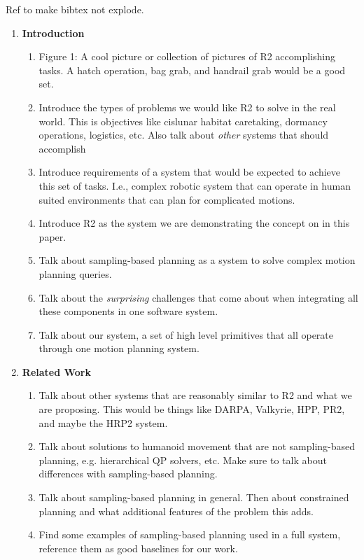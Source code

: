 Ref to make bibtex not explode.\cite{Baker2017}

\begin{enumerate}
\item \textbf{Introduction}
  \begin{enumerate}
  \item
    Figure 1: A cool picture or collection of pictures of R2 accomplishing tasks.
    A hatch operation, bag grab, and handrail grab would be a good set.
  \item
    Introduce the types of problems we would like R2 to solve in the real world.
    This is objectives like cislunar habitat caretaking, dormancy operations, logistics, etc.
    Also talk about \emph{other} systems that should accomplish 
  \item
    Introduce requirements of a system that would be expected to achieve this set of tasks.
    I.e., complex robotic system that can operate in human suited environments that can plan for complicated motions.
  \item
    Introduce R2 as the system we are demonstrating the concept on in this paper.
  \item
    Talk about sampling-based planning as a system to solve complex motion planning queries.
  \item
    Talk about the \emph{surprising} challenges that come about when integrating all these components in one software system.
  \item
    Talk about our system, a set of high level primitives that all operate through one motion planning system.
  \end{enumerate}
\item \textbf{Related Work}
  \begin{enumerate}
  \item
    Talk about other systems that are reasonably similar to R2 and what we are proposing.
    This would be things like DARPA, Valkyrie, HPP, PR2, and maybe the HRP2 system.
  \item
    Talk about solutions to humanoid movement that are not sampling-based planning, e.g. hierarchical QP solvers, etc.
    Make sure to talk about differences with sampling-based planning.
  \item
    Talk about sampling-based planning in general.
    Then about constrained planning and what additional features of the problem this adds.
  \item
    Find some examples of sampling-based planning used in a full system, reference them as good baselines for our work.

\end{enumerate}
\end{enumerate}

